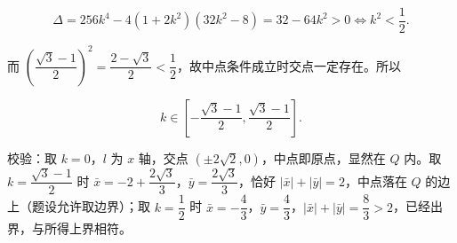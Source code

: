 \begin{answer}
\nopagebreak[4]
\[\Delta=256k^4-4(1+2k^2)(32k^2-8)=32-64k^2>0\iff k^2<\frac12.\]

而 $\left(\dfrac{\sqrt3-1}{2}\right)^2=\dfrac{2-\sqrt3}{2}<\dfrac12$，故中点条件成立时交点一定存在。所以

\nopagebreak[4]
\[k\in\left[-\frac{\sqrt3-1}{2},\frac{\sqrt3-1}{2}\right].\]

校验：取 $k=0$，$l$ 为 $x$ 轴，交点 $(\pm2\sqrt2,0)$，中点即原点，显然在 $Q$ 内。取 $k=\dfrac{\sqrt3-1}{2}$ 时 $\bar x=-2+\dfrac{2\sqrt3}{3}$，$\bar y=\dfrac{2\sqrt3}{3}$，恰好 $|\bar x|+|\bar y|=2$，中点落在 $Q$ 的边上（题设允许取边界）；取 $k=\dfrac12$ 时 $\bar x=-\dfrac43$，$\bar y=\dfrac43$，$|\bar x|+|\bar y|=\dfrac83>2$，已经出界，与所得上界相符。


\end{answer}
